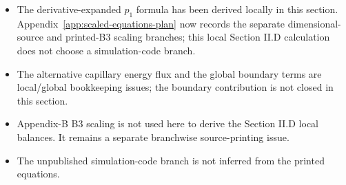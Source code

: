 \begin{itemize}
\item The derivative-expanded \(p_1\) formula has been derived locally in this
  section.  Appendix~\ref{app:scaled-equations-plan} now records the separate
  dimensional-source and printed-B3 scaling branches; this local Section II.D
  calculation does not choose a simulation-code branch.
\item The alternative capillary energy flux and the global boundary terms are
  local/global bookkeeping issues; the boundary contribution is not closed in
  this section.
\item Appendix-B B3 scaling is not used here to derive the Section II.D local
  balances.  It remains a separate branchwise source-printing issue.
\item The unpublished simulation-code branch is not inferred from the printed
  equations.
\end{itemize}
